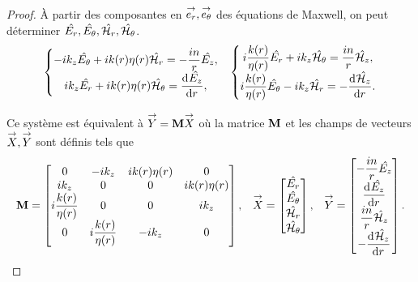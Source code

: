     \begin{proof}
      À partir des composantes en \(\vect{e_r},\vect{e_\theta}\) des équations de Maxwell, on peut déterminer \(\hat{E_r},\hat{E_\theta},\hat{\cH_r},\hat{\cH_\theta}\).
      \begin{align*}
        \left\lbrace
        \begin{matrix}
          -ik_z\hat{E_\theta} + ik(r)\eta(r) \hat{\cH_r} = -\frac{in}{r}\hat{E_z},
          \\
          ik_z\hat{E_r} + ik(r)\eta(r) \hat{\cH_\theta} = \ddp{r}{\hat{E_z}},
        \end{matrix}
        \right.
        &&
        \left\lbrace
        \begin{matrix}
          i\frac{k(r)}{\eta(r)} \hat{E_r} + ik_z \hat{\cH_\theta} = \frac{in}{r}\hat{\cH_z},
          \\
          i\frac{k(r)}{\eta(r)} \hat{E_\theta} - ik_z \hat{\cH_r} = -\ddp{r}{\hat{\cH_z}}.
        \end{matrix}
        \right.
      \end{align*}

      Ce système est équivalent à \(\vect{Y} = \mat{M}\vect{X}\) où la matrice \(\mat{M}\) et les champs de vecteurs \(\vect{X}, \vect{Y}\) sont définis tels que
      \begin{align*}
        \mat{M} =
        \begin{bmatrix}
        0 & -ik_z & ik(r)\eta(r) & 0
        \\
        ik_z & 0 & 0 & ik(r)\eta(r)
        \\
        i\frac{k(r)}{\eta(r)} & 0 & 0 & ik_z
        \\
        0 & i\frac{k(r)}{\eta(r)} & -ik_z & 0
        \end{bmatrix}
        ,&&
        \vect{X} =
        \begin{bmatrix}
          \hat{E_r}\\
          \hat{E_\theta}\\
          \hat{\cH_r}\\
          \hat{\cH_\theta}
        \end{bmatrix}
        ,&&
        \vect{Y} =
        \begin{bmatrix}
          -\frac{in}{r}\hat{E_z}\\
          \ddp{r}{\hat{E_z}}\\
          \frac{in}{r}\hat{\cH_z}\\
          -\ddp{r}{\hat{\cH_z}}
        \end{bmatrix}.
      \end{align*}


\end{proof}
